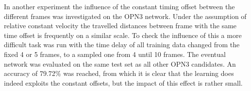 In another experiment the influence of the constant timing offset between the different frames was investigated on the OPN3 network. Under the assumption of relative constant velocity the travelled distances between frame with the same time offset is frequently on a similar scale. To check the influence of this a more difficult task was run with the time delay of all training data changed from the fixed 4 or 5 frames, to a sampled one from 4 until 10 frames. The eventual network was evaluated on the same test set as all other OPN3 candidates. An accuracy of 79.72\% was reached, from which it is clear that the learning does indeed exploits the constant offsets, but the impact of this effect is rather small.




